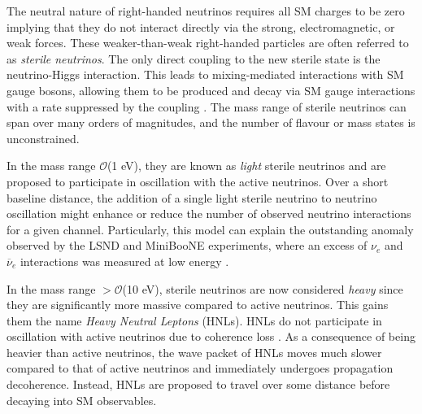 The neutral nature of right-handed neutrinos requires all SM charges to be zero implying that they do not interact directly via the strong, electromagnetic, or weak forces.
These weaker-than-weak right-handed particles are often referred to as \textit{sterile neutrinos}.
The only direct coupling to the new sterile state is the neutrino-Higgs interaction.
This leads to mixing-mediated interactions with SM gauge bosons, allowing them to be produced and decay via SM gauge interactions with a rate suppressed by the coupling \cite{SBNHNL}.
The mass range of sterile neutrinos can span over many orders of magnitudes, and the number of flavour or mass states is unconstrained.

In the mass range $\mathcal{O}$(1 eV), they are known as \textit{light} sterile neutrinos and are proposed to participate in oscillation with the active neutrinos.
Over a short baseline distance, the addition of a single light sterile neutrino to neutrino oscillation might enhance or reduce the number of observed neutrino interactions for a given channel. 
Particularly, this model can explain the outstanding anomaly observed by the LSND and MiniBooNE experiments, where an excess of $\nu_e$ and $\overline{\nu}_e$ interactions was measured at low energy \cite{LSND_anomaly, Miniboone_anomaly, HNLWhitePaper}. 

In the mass range $> \mathcal{O}$(10 eV), sterile neutrinos are now considered \textit{heavy} since they are significantly more massive compared to active neutrinos.
This gains them the name \textit{Heavy Neutral Leptons} (HNLs).
HNLs do not participate in oscillation with active neutrinos due to coherence loss \cite{SBNHNL}.
As a consequence of being heavier than active neutrinos, the wave packet of HNLs moves much slower compared to that of active neutrinos and immediately undergoes propagation decoherence.
Instead, HNLs are proposed to travel over some distance before decaying into SM observables.

